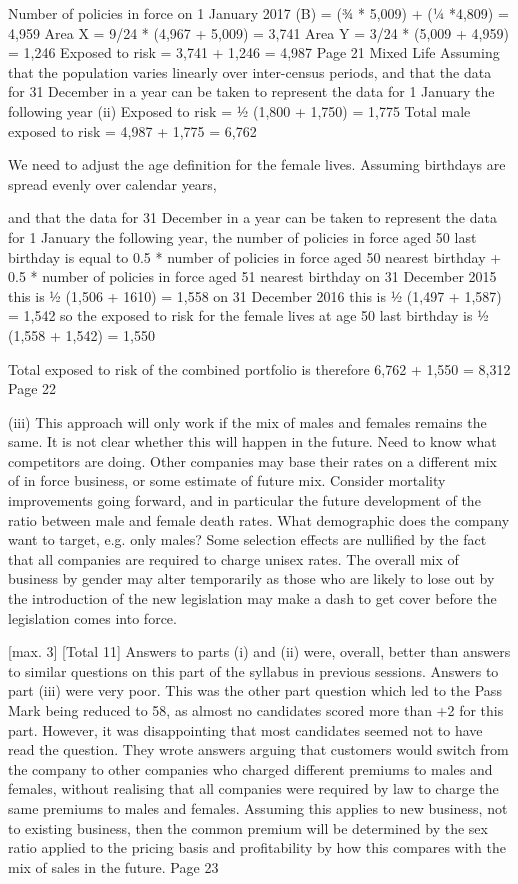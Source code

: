 \documentclass[a4paper,12pt]{article}
\begin{document}
Number of policies in force on 1 January 2017 (B)
= (3⁄4 * 5,009) + (1⁄4 *4,809) = 4,959 
Area X = 9/24 * (4,967 + 5,009) = 3,741 
Area Y = 3/24 * (5,009 + 4,959) = 1,246 
Exposed to risk = 3,741 + 1,246 = 4,987 
Page 21
Mixed Life
Assuming that the population varies linearly over inter-census periods, and
that the data for 31 December in a year can be taken to represent
the data for 1 January the following year
(ii)
Exposed to risk = 1⁄2 (1,800 + 1,750) = 1,775 
Total male exposed to risk = 4,987 + 1,775 = 6,762 

We need to adjust the age definition for the female lives.
Assuming birthdays are spread evenly over calendar years,

and that the data for 31 December in a year can be taken to represent
the data for 1 January the following year,
the number of policies in force aged 50 last birthday is equal to
0.5 * number of policies in force aged 50 nearest birthday
+ 0.5 * number of policies in force aged 51 nearest birthday 
on 31 December 2015 this is 1⁄2 (1,506 + 1610) = 1,558 
on 31 December 2016 this is 1⁄2 (1,497 + 1,587) = 1,542 
so the exposed to risk for the female lives at age 50 last birthday is
1⁄2 (1,558 + 1,542) = 1,550

Total exposed to risk of the combined portfolio is therefore
6,762 + 1,550 = 8,312
Page 22


(iii)
This approach will only work if the mix of males and females
remains the same. 
It is not clear whether this will happen in the future. 
Need to know what competitors are doing. 
Other companies may base their rates on a different mix of
in force business, or some estimate of future mix. 
Consider mortality improvements going forward, and in particular
the future development of the ratio between male and female death rates. 
What demographic does the company want to target, e.g. only males? 
Some selection effects are nullified by the fact that all companies are
required to charge unisex rates. 
The overall mix of business by gender may alter temporarily as those who
are likely to lose out by the introduction of the new legislation may make
a dash to get cover before the legislation comes into force.

[max. 3]
[Total 11]
Answers to parts (i) and (ii) were, overall, better than answers to similar
questions on this part of the syllabus in previous sessions. Answers to part
(iii) were very poor. This was the other part question which led to the
Pass Mark being reduced to 58, as almost no candidates scored more than
+2 for this part. However, it was disappointing that most candidates
seemed not to have read the question. They wrote answers arguing that
customers would switch from the company to other companies who
charged different premiums to males and females, without realising that
all companies were required by law to charge the same premiums to males
and females. Assuming this applies to new business, not to existing
business, then the common premium will be determined by the sex ratio
applied to the pricing basis and profitability by how this compares with
the mix of sales in the future.
Page 23
\end{document}

